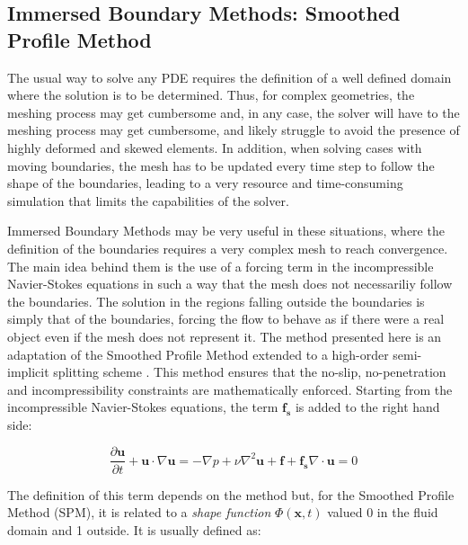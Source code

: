 \subsection{Immersed Boundary Methods: Smoothed Profile Method}
\label{SPM}

The usual way to solve any PDE requires the definition of a well defined domain
where the solution is to be determined. Thus, for complex geometries, the
meshing process may get cumbersome and, in any case, the solver will have to
the meshing process may get cumbersome, and likely struggle to avoid the
presence of highly deformed and skewed elements. In addition, when solving
cases with moving boundaries, the mesh has to be updated every time step to
follow the shape of the boundaries, leading to a very resource and
time-consuming simulation that limits the capabilities of the solver.

Immersed Boundary Methods may be very useful in these situations, where the
definition of the boundaries requires a very complex mesh to reach
convergence. The main idea behind them is the use of a forcing term in the
incompressible Navier-Stokes equations in such a way that the mesh does not
necessariliy follow the boundaries. The solution in the regions falling outside
the boundaries is simply that of the boundaries, forcing the flow to behave as
if there were a real object even if the mesh does not represent it. The method
presented here is an adaptation of the Smoothed Profile Method
\cite{NakayamaSPM} extended to a high-order semi-implicit splitting scheme
\cite{LuoSPM, WangSPM}. This method ensures that the no-slip, no-penetration
and incompressibility constraints are mathematically enforced. Starting from
the incompressible Navier-Stokes equations, the term $\mathbf{f_s}$ is added to
the right hand side:

\begin{subequations}
\begin{equation} \label{spm:eq:SPMeqmov}
    \frac{\partial\mathbf{u}}{\partial t} + \mathbf{u}\cdot\nabla\mathbf{u} =
        -\nabla p + \nu\nabla^2\mathbf{u} + \mathbf{f} + \mathbf{f_s}
\end{equation}
\begin{equation}
    \nabla\cdot\mathbf{u} = 0
\end{equation}
\end{subequations}

The definition of this term depends on the method but, for the Smoothed Profile
Method (SPM), it is related to a \emph{shape function} $\Phi(\mathbf{x}, t)$
valued 0 in the fluid domain and 1 outside. It is usually defined as:

